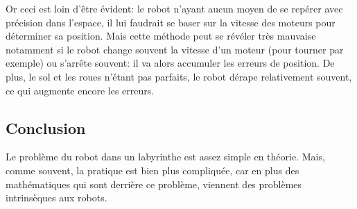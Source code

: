     Or ceci est loin d'être évident: le robot n'ayant aucun moyen de se repérer
    avec précision dans l'espace, il lui faudrait se baser sur la vitesse des
    moteurs pour déterminer sa position. Mais cette méthode peut se révéler
    très mauvaise notamment si le robot change souvent la vitesse d'un moteur
    (pour tourner par exemple) ou s'arrête souvent: il va alors accumuler les
    erreurs de position. De plus, le sol et les roues n'étant pas parfaits, le 
    robot dérape relativement souvent, ce qui augmente encore les erreurs.

  \subsection{Conclusion}
    Le problème du robot dans un labyrinthe est assez simple en théorie. Mais,
    comme souvent, la pratique est bien plus compliquée, car en plus des
    mathématiques qui sont derrière ce problème, viennent des problèmes
    intrinsèques aux robots.

